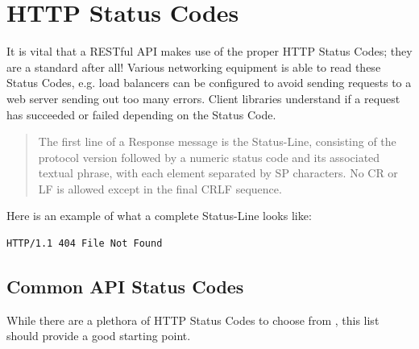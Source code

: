 \documentclass{book}
\begin{document}
\section{HTTP Status Codes}

It is vital that a RESTful API makes use of the proper HTTP Status Codes; they are a standard after all! Various networking equipment is able to read these Status Codes, e.g. load balancers can be configured to avoid sending requests to a web server sending out too many errors. Client libraries understand if a request has succeeded or failed depending on the Status Code.

\begin{quote}
The first line of a Response message is the Status-Line, consisting of the protocol version followed by a numeric status code and its associated textual phrase, with each element separated by SP characters. No CR or LF is allowed except in the final CRLF sequence. \cite{RFC2616}
\end{quote}

Here is an example of what a complete Status-Line looks like:

\begin{verbatim}
HTTP/1.1 404 File Not Found
\end{verbatim}

\subsection{Common API Status Codes}

While there are a plethora of HTTP Status Codes to choose from \cite{RFC2616}, this list should provide a good starting point.
\end{document}
